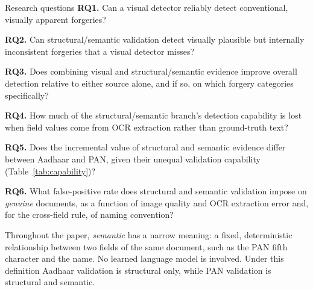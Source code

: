 \documentclass[conference]{IEEEtran}
\begin{document}
\begin{rqbox}{Research questions}
\textbf{RQ1.} Can a visual detector reliably detect conventional,
visually apparent forgeries?\par\smallskip
\textbf{RQ2.} Can structural/semantic validation detect visually
plausible but internally inconsistent forgeries that a visual detector
misses?\par\smallskip
\textbf{RQ3.} Does combining visual and structural/semantic evidence
improve overall detection relative to either source alone, and if so,
on which forgery categories specifically?\par\smallskip
\textbf{RQ4.} How much of the structural/semantic branch's detection
capability is lost when field values come from OCR extraction rather
than ground-truth text?\par\smallskip
\textbf{RQ5.} Does the incremental value of structural and semantic
evidence differ between Aadhaar and PAN, given their unequal validation
capability (Table~\ref{tab:capability})?\par\smallskip
\textbf{RQ6.} What false-positive rate does structural and semantic
validation impose on \emph{genuine} documents, as a function of image
quality and OCR extraction error and, for the cross-field rule, of
naming convention?
\end{rqbox}

Throughout the paper, \emph{semantic} has a narrow meaning: a fixed,
deterministic relationship between two fields of the same document,
such as the PAN fifth character and the name. No learned language model
is involved. Under this definition Aadhaar validation is structural
only, while PAN validation is structural and semantic.
\end{document}
